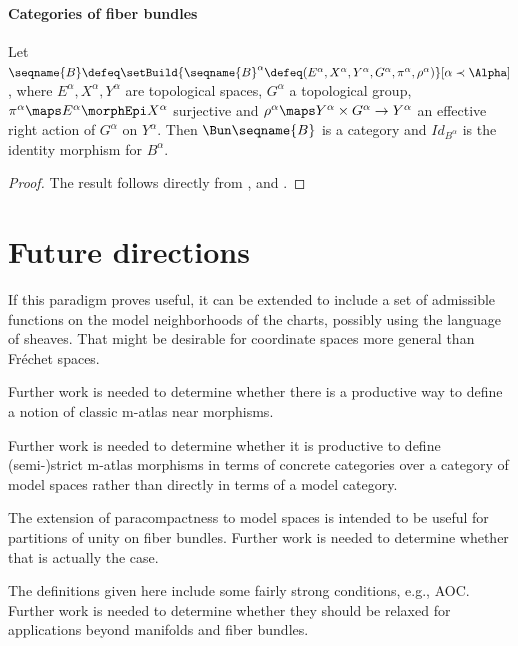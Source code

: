 \documentclass{article}
\begin{document}
\subsection{Categories of fiber bundles}
\begin{theorem}
\label{the:Bun}
Let \\
$
  \seqname{B}
  \defeq
  \setBuild
    {{
      \seqname{B}^\alpha \defeq
      (
        E^\alpha,
        X^\alpha,
        Y^\alpha,
        G^\alpha,
        \pi^\alpha,
        \rho^\alpha
      )
    }}%
    [
      \alpha \prec \Alpha
    ]
$,
where $E^\alpha, X^\alpha, Y^\alpha$ are topological spaces,
$G^\alpha$ a topological group,
$\pi^\alpha \maps E^\alpha \morphEpi X^\alpha$ surjective and
$\rho^\alpha \maps Y^\alpha \times G^\alpha \to Y^\alpha$
an effective right action of $G^\alpha$ on $Y^\alpha$. Then
$\Bun \seqname{B}$ is a category and $Id_{B^\alpha}$ is the identity
morphism for $B^\alpha$.

\begin{proof}
{
  \showlabelsinline
  The result follows directly from ,
}
 and .
\end{proof}
\end{theorem}

\part{Future directions}
\label{part:fut}
If this paradigm proves useful, it can be extended to include a set of
admissible functions on the model neighborhoods of the charts,
possibly using the language of sheaves. That might be desirable for
coordinate spaces more general than Fr\'echet spaces.

Further work is needed to determine whether there is a productive way to
define a notion of classic m-atlas near morphisms.

Further work is needed to determine whether it is productive to define
(semi-)strict m-atlas morphisms in terms of concrete categories over a
category of model spaces rather than directly in terms of a model
category.

The extension of paracompactness to model spaces is intended to be
useful for partitions of unity on fiber bundles. Further work is
needed to determine whether that is actually the case.

The definitions given here include some fairly strong conditions,
e.g., AOC. Further work is needed to determine whether they should be
relaxed for applications beyond manifolds and fiber bundles.
\end{document}

